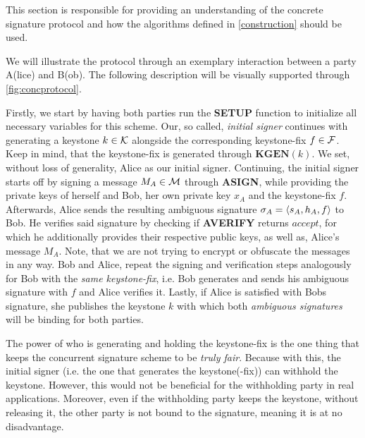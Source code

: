 This section is responsible for providing an understanding of the concrete signature protocol and how the algorithms defined in \autoref{construction} should be used.

We will illustrate the protocol through an exemplary interaction between a party A(lice) and B(ob). 
The following description will be visually supported through \autoref{fig:concprotocol}. 

Firstly, we start by having both parties run the \textbf{SETUP} function to initialize all necessary variables for this scheme.
Our, so called, \textit{initial signer} continues with generating a keystone \(k\in\mathcal{K}\) alongside the corresponding keystone-fix \(f\in\mathcal{F}\).
Keep in mind, that the keystone-fix is generated through \(\textbf{KGEN}(k)\).
We set, without loss of generality, Alice as our initial signer.
Continuing, the initial signer starts off by signing a message \(M_A\in\mathcal{M}\) through \textbf{ASIGN}, while providing the private keys of herself and Bob, her own private key \(x_A\) and the keystone-fix \(f\).
Afterwards, Alice sends the resulting ambiguous signature \(\sigma_A = \langle s_A, h_A, f \rangle\) to Bob.
He verifies said signature by checking if \textbf{AVERIFY} returns \(accept\), for which he additionally provides their respective public keys, as well as, Alice's message \(M_A\).
Note, that we are not trying to encrypt or obfuscate the messages in any way.
Bob and Alice, repeat the signing and verification steps analogously for Bob with the \textit{same keystone-fix}, i.e. Bob generates and sends his ambiguous signature with \(f\) and Alice verifies it.
Lastly, if Alice is satisfied with Bobs signature, she publishes the keystone \(k\) with which both \textit{ambiguous signatures} will be binding for both parties.

The power of who is generating and holding the keystone-fix is the one thing that keeps the concurrent signature scheme to be \textit{truly fair}.
Because with this, the initial signer (i.e. the one that generates the keystone(-fix)) can withhold the keystone.
However, this would not be beneficial for the withholding party in real applications.
Moreover, even if the withholding party keeps the keystone, without releasing it, the other party is not bound to the signature, meaning it is at no disadvantage. 

